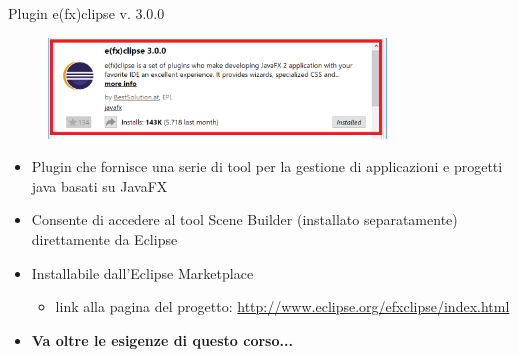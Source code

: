 \documentclass[presentation]{beamer}
\begin{document}
\begin{frame}{Plugin e(fx)clipse v. 3.0.0}
\begin{figure}
\includegraphics[width=0.8\textwidth]{img/plugin-install.png}
\end{figure}
\begin{itemize}\itemsep5pt
\item Plugin che fornisce una serie di tool per la gestione di applicazioni e progetti java basati su JavaFX
\item Consente di accedere al tool Scene Builder (installato separatamente) direttamente da Eclipse
\item Installabile dall'Eclipse Marketplace
\begin{itemize}
\item link alla pagina del progetto: \url{http://www.eclipse.org/efxclipse/index.html}
\end{itemize}
\item \textbf{Va oltre le esigenze di questo corso...}
\end{itemize}
\end{frame}



%
\end{document}
